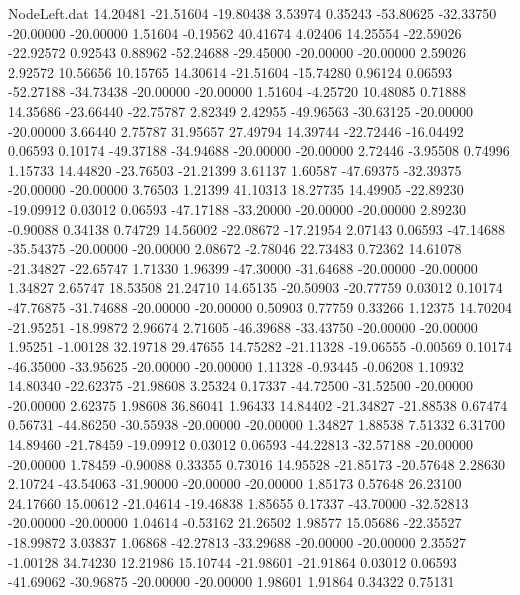\begin{filecontents}{NodeLeft.dat}
  14.20481  -21.51604  -19.80438     3.53974    0.35243  -53.80625  -32.33750  -20.00000  -20.00000    1.51604   -0.19562   40.41674    4.02406
  14.25554  -22.59026  -22.92572     0.92543    0.88962  -52.24688  -29.45000  -20.00000  -20.00000    2.59026    2.92572   10.56656   10.15765
  14.30614  -21.51604  -15.74280     0.96124    0.06593  -52.27188  -34.73438  -20.00000  -20.00000    1.51604   -4.25720   10.48085    0.71888
  14.35686  -23.66440  -22.75787     2.82349    2.42955  -49.96563  -30.63125  -20.00000  -20.00000    3.66440    2.75787   31.95657   27.49794
  14.39744  -22.72446  -16.04492     0.06593    0.10174  -49.37188  -34.94688  -20.00000  -20.00000    2.72446   -3.95508    0.74996    1.15733
  14.44820  -23.76503  -21.21399     3.61137    1.60587  -47.69375  -32.39375  -20.00000  -20.00000    3.76503    1.21399   41.10313   18.27735
  14.49905  -22.89230  -19.09912     0.03012    0.06593  -47.17188  -33.20000  -20.00000  -20.00000    2.89230   -0.90088    0.34138    0.74729
  14.56002  -22.08672  -17.21954     2.07143    0.06593  -47.14688  -35.54375  -20.00000  -20.00000    2.08672   -2.78046   22.73483    0.72362
  14.61078  -21.34827  -22.65747     1.71330    1.96399  -47.30000  -31.64688  -20.00000  -20.00000    1.34827    2.65747   18.53508   21.24710
  14.65135  -20.50903  -20.77759     0.03012    0.10174  -47.76875  -31.74688  -20.00000  -20.00000    0.50903    0.77759    0.33266    1.12375
  14.70204  -21.95251  -18.99872     2.96674    2.71605  -46.39688  -33.43750  -20.00000  -20.00000    1.95251   -1.00128   32.19718   29.47655
  14.75282  -21.11328  -19.06555    -0.00569    0.10174  -46.35000  -33.95625  -20.00000  -20.00000    1.11328   -0.93445   -0.06208    1.10932
  14.80340  -22.62375  -21.98608     3.25324    0.17337  -44.72500  -31.52500  -20.00000  -20.00000    2.62375    1.98608   36.86041    1.96433
  14.84402  -21.34827  -21.88538     0.67474    0.56731  -44.86250  -30.55938  -20.00000  -20.00000    1.34827    1.88538    7.51332    6.31700
  14.89460  -21.78459  -19.09912     0.03012    0.06593  -44.22813  -32.57188  -20.00000  -20.00000    1.78459   -0.90088    0.33355    0.73016
  14.95528  -21.85173  -20.57648     2.28630    2.10724  -43.54063  -31.90000  -20.00000  -20.00000    1.85173    0.57648   26.23100   24.17660
  15.00612  -21.04614  -19.46838     1.85655    0.17337  -43.70000  -32.52813  -20.00000  -20.00000    1.04614   -0.53162   21.26502    1.98577
  15.05686  -22.35527  -18.99872     3.03837    1.06868  -42.27813  -33.29688  -20.00000  -20.00000    2.35527   -1.00128   34.74230   12.21986
  15.10744  -21.98601  -21.91864     0.03012    0.06593  -41.69062  -30.96875  -20.00000  -20.00000    1.98601    1.91864    0.34322    0.75131

\end{filecontents}
